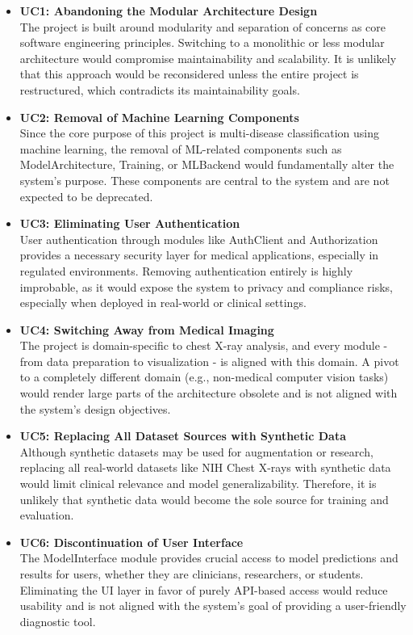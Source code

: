 \documentclass[12pt, titlepage]{article}
\begin{document}
\begin{itemize}
    \item \textbf{UC1: Abandoning the Modular Architecture Design} \\
    The project is built around modularity and separation of concerns as core software engineering principles. Switching to a monolithic or less modular architecture would compromise maintainability and scalability. It is unlikely that this approach would be reconsidered unless the entire project is restructured, which contradicts its maintainability goals.
    
    \item \textbf{UC2: Removal of Machine Learning Components} \\
    Since the core purpose of this project is multi-disease classification using machine learning, the removal of ML-related components such as ModelArchitecture, Training, or MLBackend would fundamentally alter the system's purpose. These components are central to the system and are not expected to be deprecated.
    
    \item \textbf{UC3: Eliminating User Authentication} \\
    User authentication through modules like AuthClient and Authorization provides a necessary security layer for medical applications, especially in regulated environments. Removing authentication entirely is highly improbable, as it would expose the system to privacy and compliance risks, especially when deployed in real-world or clinical settings.
    
    \item \textbf{UC4: Switching Away from Medical Imaging} \\
    The project is domain-specific to chest X-ray analysis, and every module - from data preparation to visualization - is aligned with this domain. A pivot to a completely different domain (e.g., non-medical computer vision tasks) would render large parts of the architecture obsolete and is not aligned with the system's design objectives.
    
    \item \textbf{UC5: Replacing All Dataset Sources with Synthetic Data} \\
    Although synthetic datasets may be used for augmentation or research, replacing all real-world datasets like NIH Chest X-rays with synthetic data would limit clinical relevance and model generalizability. Therefore, it is unlikely that synthetic data would become the sole source for training and evaluation.
    
    \item \textbf{UC6: Discontinuation of User Interface} \\
    The ModelInterface module provides crucial access to model predictions and results for users, whether they are clinicians, researchers, or students. Eliminating the UI layer in favor of purely API-based access would reduce usability and is not aligned with the system's goal of providing a user-friendly diagnostic tool.
\end{itemize}
\end{document}
